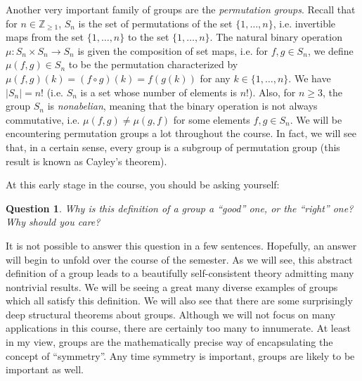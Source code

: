 \documentclass[11pt, reqno]{amsart}
\newtheorem{question}[thm]{Question}
\theoremstyle{remark}
\numberwithin{equation}{subsection}
\numberwithin{figure}{section}
\numberwithin{table}{section}
\newcommand{\Z}{\mathbb{Z}}
\newcommand{\sss}{\vspace{2.5 mm}}
\begin{document}
Another very important family of groups are the {\em permutation groups}. Recall that for $n \in \Z_{\geq 1}$, $S_n$ is the set of permutations of the set $\{1,\dots,n\}$,
i.e. invertible maps from the set $\{1,\dots, n\}$ to the set $\{1,\dots,n\}$. The natural binary operation $\mu: S_n \times S_n \rightarrow S_n$ is given the composition of set maps, i.e. for 
$f,g \in S_n$, we define $\mu(f,g) \in S_n$ to be the permutation characterized by $\mu(f,g)(k) = (f \circ g)(k) = f(g(k))$ for any $k \in \{1,\dots, n\}$.
We have $|S_n| = n!$ (i.e. $S_n$ is a set whose number of elements is $n!$). Also, for $n \geq 3$, the group $S_n$ is {\em nonabelian}, meaning that the binary operation is not always commutative, i.e. $\mu(f,g) \neq \mu(g,f)$ for some elements $f,g \in S_n$.
We will be encountering permutation groups a lot throughout the course. 
In fact, we will see that, in a certain sense, every group is a subgroup of permutation group (this result is known as Cayley's theorem).	

\sss

At this early stage in the course, you should be asking yourself:
\begin{question}
Why is this definition of a group a ``good'' one, or the ``right'' one? Why should you care?
\end{question}
It is not possible to answer this question in a few sentences. Hopefully, an answer will begin to unfold over the course of the semester.
As we will see, this abstract definition of a group leads to a beautifully self-consistent theory admitting many nontrivial results. We will be seeing a great many diverse examples of groups which all satisfy this definition. We will also see that there are some surprisingly deep structural theorems about groups. 
Although we will not focus on many applications in this course, there are certainly too many to innumerate. At least in my view, groups are the mathematically precise way of encapsulating the concept of ``symmetry''. Any time symmetry is important, groups are likely to be important as well. 

\sss
\end{document}
